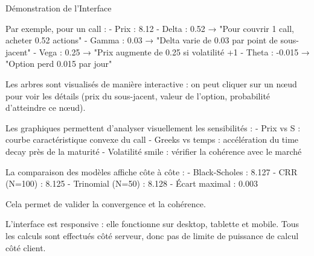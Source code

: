 \documentclass[aspectratio=169, 10pt]{beamer}
\begin{document}
\begin{frame}{Démonstration de l'Interface}
{        Par exemple, pour un call :
        - Prix : 8.12
        - Delta : 0.52 → "Pour couvrir 1 call, acheter 0.52 actions"
        - Gamma : 0.03 → "Delta varie de 0.03 par point de sous-jacent"
        - Vega : 0.25 → "Prix augmente de 0.25 si volatilité +1%
        - Theta : -0.015 → "Option perd 0.015 par jour"
        
        Les arbres sont visualisés de manière interactive :
        on peut cliquer sur un nœud pour voir les détails (prix du sous-jacent,
        valeur de l'option, probabilité d'atteindre ce nœud).
        
        Les graphiques permettent d'analyser visuellement les sensibilités :
        - Prix vs S : courbe caractéristique convexe du call
        - Greeks vs temps : accélération du time decay près de la maturité
        - Volatilité smile : vérifier la cohérence avec le marché
        
        La comparaison des modèles affiche côte à côte :
        - Black-Scholes : 8.127
        - CRR (N=100) : 8.125
        - Trinomial (N=50) : 8.128
        - Écart maximal : 0.003
        
        Cela permet de valider la convergence et la cohérence.
        
        L'interface est responsive : elle fonctionne sur desktop, tablette et mobile.
        Tous les calculs sont effectués côté serveur, donc pas de limite
        de puissance de calcul côté client.
    }
\end{frame}
\end{document}
